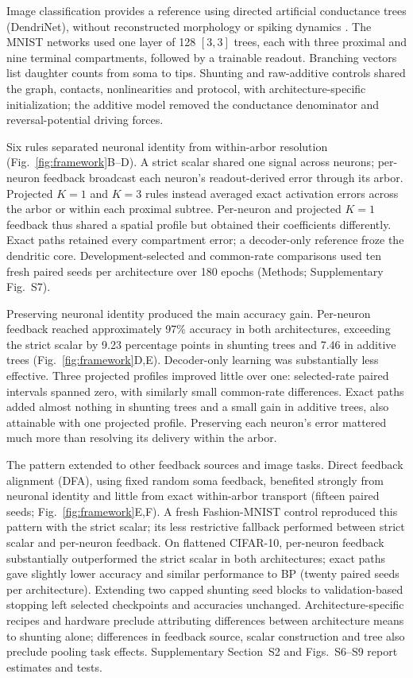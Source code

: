 \documentclass[11pt]{article}
\begin{document}
Image classification provides a reference using directed artificial conductance trees (DendriNet), without reconstructed morphology or spiking dynamics \citep{safaai2026gainload}. The MNIST networks used one layer of 128 $[3,3]$ trees, each with three proximal and nine terminal compartments, followed by a trainable readout. Branching vectors list daughter counts from soma to tips. Shunting and raw-additive controls shared the graph, contacts, nonlinearities and protocol, with architecture-specific initialization; the additive model removed the conductance denominator and reversal-potential driving forces.

Six rules separated neuronal identity from within-arbor resolution (Fig.~\ref{fig:framework}B--D). A strict scalar shared one signal across neurons; per-neuron feedback broadcast each neuron's readout-derived error through its arbor. Projected $K=1$ and $K=3$ rules instead averaged exact activation errors across the arbor or within each proximal subtree. Per-neuron and projected $K=1$ feedback thus shared a spatial profile but obtained their coefficients differently. Exact paths retained every compartment error; a decoder-only reference froze the dendritic core. Development-selected and common-rate comparisons used ten fresh paired seeds per architecture over 180 epochs (Methods; Supplementary Fig.~S7).

Preserving neuronal identity produced the main accuracy gain. Per-neuron feedback reached approximately 97\% accuracy in both architectures, exceeding the strict scalar by 9.23 percentage points in shunting trees and 7.46 in additive trees (Fig.~\ref{fig:framework}D,E). Decoder-only learning was substantially less effective. Three projected profiles improved little over one: selected-rate paired intervals spanned zero, with similarly small common-rate differences. Exact paths added almost nothing in shunting trees and a small gain in additive trees, also attainable with one projected profile. Preserving each neuron's error mattered much more than resolving its delivery within the arbor.

The pattern extended to other feedback sources and image tasks. Direct feedback alignment (DFA), using fixed random soma feedback, benefited strongly from neuronal identity and little from exact within-arbor transport \citep{nokland2016dfa} (fifteen paired seeds; Fig.~\ref{fig:framework}E,F). A fresh Fashion-MNIST control reproduced this pattern with the strict scalar; its less restrictive fallback performed between strict scalar and per-neuron feedback. On flattened CIFAR-10, per-neuron feedback substantially outperformed the strict scalar in both architectures; exact paths gave slightly lower accuracy and similar performance to BP (twenty paired seeds per architecture). Extending two capped shunting seed blocks to validation-based stopping left selected checkpoints and accuracies unchanged. Architecture-specific recipes and hardware preclude attributing differences between architecture means to shunting alone; differences in feedback source, scalar construction and tree also preclude pooling task effects. Supplementary Section~S2 and Figs.~S6--S9 report estimates and tests.
\end{document}
